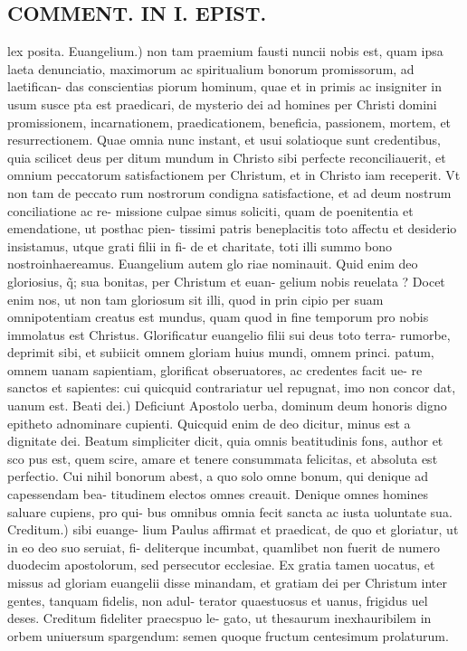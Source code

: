 \documentclass{article}
\begin{document}
\begin{pages}
\section*{COMMENT. IN I. EPIST. }
\marginpar{[ p.472 ]}\pstart lex posita. Euangelium.) non tam praemium fausti nuncii nobis est, quam ipsa laeta denunciatio, maximorum ac spiritualium bonorum promissorum, ad laetifican- das conscientias piorum hominum, quae et in primis ac insigniter in usum susce pta est praedicari, de mysterio dei ad homines per Christi domini promissionem, incarnationem, praedicationem, beneficia, passionem, mortem, et resurrectionem. Quae omnia nunc instant, et usui solatioque sunt credentibus, quia scilicet deus per ditum mundum in Christo sibi perfecte reconciliauerit, et omnium peccatorum satisfactionem per Christum, et in Christo iam receperit. Vt non tam de peccato rum nostrorum condigna satisfactione, et ad deum nostrum conciliatione ac re- missione culpae simus soliciti, quam de poenitentia et emendatione, ut posthac pien- tissimi patris beneplacitis toto affectu et desiderio insistamus, utque grati filii in fi- de et charitate, toti illi summo bono nostroinhaereamus. Euangelium autem glo riae nominauit. Quid enim deo gloriosius, q̃; sua bonitas, per Christum et euan- gelium nobis reuelata ? Docet enim nos, ut non tam gloriosum sit illi, quod in prin cipio per suam omnipotentiam creatus est mundus, quam quod in fine temporum pro nobis immolatus est Christus. Glorificatur euangelio filii sui deus toto terra- rumorbe, deprimit sibi, et subiicit omnem gloriam huius mundi, omnem princi. patum, omnem uanam sapientiam, glorificat obseruatores, ac credentes facit ue- re sanctos et sapientes: cui quicquid contrariatur uel repugnat, imo non concor dat, uanum est. Beati dei.) Deficiunt Apostolo uerba, dominum deum honoris digno epitheto adnominare cupienti. Quicquid enim de deo dicitur, minus est a dignitate dei. Beatum simpliciter dicit, quia omnis beatitudinis fons, author et sco pus est, quem scire, amare et tenere consummata felicitas, et absoluta est perfectio. Cui nihil bonorum abest, a quo solo omne bonum, qui denique ad capessendam bea- titudinem electos omnes creauit. Denique omnes homines saluare cupiens, pro qui- bus omnibus omnia fecit sancta ac iusta uoluntate sua. Creditum.) sibi euange- lium Paulus affirmat et praedicat, de quo et gloriatur, ut in eo deo suo seruiat, fi- deliterque incumbat, quamlibet non fuerit de numero duodecim apostolorum, sed persecutor ecclesiae. Ex gratia tamen uocatus, et missus ad gloriam euangelii disse minandam, et gratiam dei per Christum inter gentes, tanquam fidelis, non adul- terator quaestuosus et uanus, frigidus uel deses. Creditum fideliter praecspuo le- gato, ut thesaurum inexhauribilem in orbem uniuersum spargendum: semen quoque fructum centesimum prolaturum.  \pend
{}
{}

\end{pages}
\end{document}
